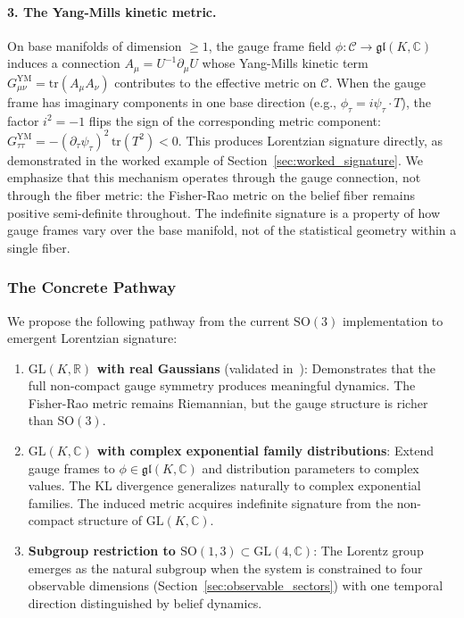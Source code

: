 \documentclass[11pt]{article}
\begin{document}
\paragraph{3. The Yang-Mills kinetic metric.} On base manifolds of dimension $\geq 1$, the gauge frame field $\phi: \mathcal{C} \to \mathfrak{gl}(K, \mathbb{C})$ induces a connection $A_\mu = U^{-1}\partial_\mu U$ whose Yang-Mills kinetic term $G_{\mu\nu}^{\mathrm{YM}} = \mathrm{tr}(A_\mu A_\nu)$ contributes to the effective metric on $\mathcal{C}$. When the gauge frame has imaginary components in one base direction (e.g., $\phi_\tau = i\psi_\tau \cdot T$), the factor $i^2 = -1$ flips the sign of the corresponding metric component: $G_{\tau\tau}^{\mathrm{YM}} = -(\partial_\tau \psi_\tau)^2 \,\mathrm{tr}(T^2) < 0$. This produces Lorentzian signature directly, as demonstrated in the worked example of Section~\ref{sec:worked_signature}. We emphasize that this mechanism operates through the gauge connection, not through the fiber metric: the Fisher-Rao metric on the belief fiber remains positive semi-definite throughout. The indefinite signature is a property of how gauge frames vary over the base manifold, not of the statistical geometry within a single fiber.

\subsubsection{The Concrete Pathway}

We propose the following pathway from the current $\mathrm{SO}(3)$ implementation to emergent Lorentzian signature:

\begin{enumerate}
\item \textbf{$\mathrm{GL}(K, \mathbb{R})$ with real Gaussians} (validated in~\cite{Dennis2026GL}): Demonstrates that the full non-compact gauge symmetry produces meaningful dynamics. The Fisher-Rao metric remains Riemannian, but the gauge structure is richer than $\mathrm{SO}(3)$.

\item \textbf{$\mathrm{GL}(K, \mathbb{C})$ with complex exponential family distributions}: Extend gauge frames to $\phi \in \mathfrak{gl}(K, \mathbb{C})$ and distribution parameters to complex values. The KL divergence generalizes naturally to complex exponential families. The induced metric acquires indefinite signature from the non-compact structure of $\mathrm{GL}(K, \mathbb{C})$.

\item \textbf{Subgroup restriction to $\mathrm{SO}(1,3) \subset \mathrm{GL}(4, \mathbb{C})$}: The Lorentz group emerges as the natural subgroup when the system is constrained to four observable dimensions (Section~\ref{sec:observable_sectors}) with one temporal direction distinguished by belief dynamics.
\end{enumerate}
\end{document}
